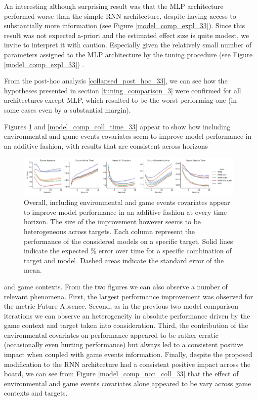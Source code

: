 An interesting although surprising result was that the MLP architecture performed worse than the simple RNN architecture, despite having access to substantially more information (see Figure \ref{model_comp_expl_33}). Since this result was not expected a-priori and the estimated effect size is quite modest, we invite to interpret it with caution. Especially given the relatively small number of parameters assigned to the MLP architecture by the tuning procedure (see Figure \ref{model_comp_expl_33}) .

From the post-hoc analysis \ref{collapsed_post_hoc_33}, we can see how the hypotheses presented in section \ref{tuning_comparison_3} were confirmed for all architectures except MLP, which resulted to be the worst performing one (in some cases even by a substantial margin).

Figures \ref{model_comp_coll_game_33} and \ref{model_comp_coll_time_33} appear to show how including environmental and game events covariates seem to improve model performance in an additive fashion, with results that are consistent across horizons

\begin{figure}[h]
\centering
\includegraphics[width=\textwidth]{images/chapter_3/models_comparison_collapsed_game_33.png}
\caption[\textbf{Model comparison collapsing over game context}]{ Overall, including environmental and game events covariates appear to improve model performance in an additive fashion at every time horizon. The size of the improvement however seems to be heterogeneous across targets. Each column represent the performance of the considered models on a specific target. Solid lines indicate the expected \% error over time for a specific combination of target and model. Dashed areas indicate the standard error of the mean.}
\label{model_comp_coll_game_33}
\end{figure}

and game contexts. From the two figures we can also observe a number of relevant phenomena. First, the largest performance improvement was observed for the metric Future Absence. Second, as in the previous two model comparison iterations we can observe an heterogeneity in absolute performance driven by the game context and target taken into consideration. Third, the contribution of the environmental covariates on performance appeared to be rather erratic (occasionally even hurting performance) but always led to a consistent positive impact when coupled with game events information. Finally, despite the proposed modification to the RNN architecture had a consistent positive impact across the board, we can see from Figure \ref{model_comp_non_coll_33} that the effect of environmental and game events covariates alone appeared to be vary across game contexts and targets.

